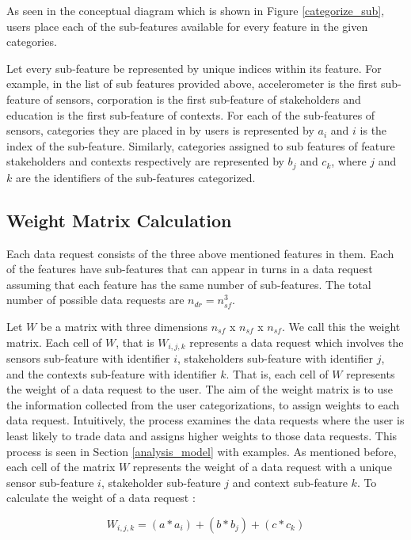 As seen in the conceptual diagram which is shown in Figure \ref{categorize_sub}, users place each of the sub-features available for every feature in the given categories.

Let every sub-feature be represented by unique indices within its feature. For example, in the list of sub features provided above, accelerometer is the first sub-feature of sensors, corporation is the first sub-feature of stakeholders and education is the first sub-feature of contexts. For each of the sub-features of sensors, categories they are placed in by users is represented by $a_{i}$ and $i$ is the index
of the sub-feature. Similarly, categories assigned to sub features of feature stakeholders and contexts respectively are represented by $b_{j}$ and $c_{k}$, where $j$ and $k$ are the identifiers of the sub-features categorized.

\subsection{Weight Matrix Calculation}
Each data request consists of the three above mentioned features in them. Each of the features have \numsubfeatures sub-features that can appear in turns in a data request assuming that each feature has the same number of sub-features. The total number of possible data requests are $n_{dr} =  n_{sf}^3$.

Let $W$  be a matrix with three dimensions $n_{sf}$ x $n_{sf}$ x $n_{sf}$. We call this the weight matrix.
Each cell of $W$, that is $W_{i,j,k}$ represents a data request which involves the sensors sub-feature with identifier $i$, stakeholders sub-feature with identifier $j$,
and the contexts sub-feature with identifier $k$. That is, each cell of $W$ represents the weight of a data request to the user. The aim of the weight matrix is to use the information collected from the user categorizations, to assign weights to each data request. Intuitively, the process examines the
data requests where the user is least likely to trade data and assigns higher weights to those data requests. This process is seen in
Section \ref{analysis_model} with examples. As mentioned before, each cell of the matrix $W$ represents the weight of a data request with a unique sensor sub-feature $i$, stakeholder sub-feature $j$ and context sub-feature $k$. To calculate the weight of a data request :

\begin{equation}
W_{i,j,k} = (a*a_{i}) + (b*b_{j}) + (c*c_{k})
\end{equation}

